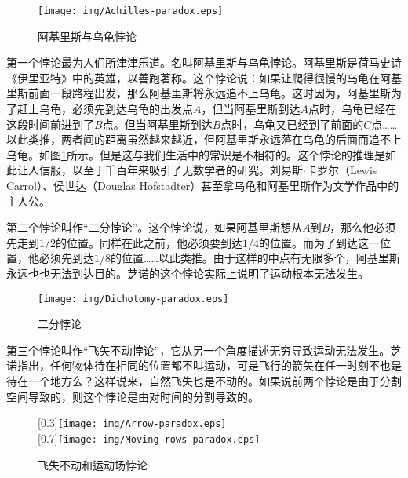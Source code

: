 \documentclass{article}
\begin{document}
\begin{figure}[htbp]
 \centering
 \texttt{[image: img/Achilles-paradox.eps]}
 \caption{阿基里斯与乌龟悖论}
 \label{fig:Achilles-paradox}
\end{figure}

第一个悖论最为人们所津津乐道。名叫阿基里斯与乌龟悖论。阿基里斯是荷马史诗《伊里亚特》中的英雄，以善跑著称。这个悖论说：如果让爬得很慢的乌龟在阿基里斯前面一段路程出发，那么阿基里斯将永远追不上乌龟。这时因为，阿基里斯为了赶上乌龟，必须先到达乌龟的出发点$A$，但当阿基里斯到达$A$点时，乌龟已经在这段时间前进到了$B$点。但当阿基里斯到达$B$点时，乌龟又已经到了前面的$C$点……以此类推，两者间的距离虽然越来越近，但阿基里斯永远落在乌龟的后面而追不上乌龟。如图\ref{fig:Achilles-paradox}所示。但是这与我们生活中的常识是不相符的。这个悖论的推理是如此让人信服，以至于千百年来吸引了无数学者的研究。刘易斯$\cdot$卡罗尔（Lewis Carrol）、侯世达（Douglas Hofstadter）甚至拿乌龟和阿基里斯作为文学作品中的主人公。

第二个悖论叫作“二分悖论”。这个悖论说，如果阿基里斯想从$A$到$B$，那么他必须先走到$1/2$的位置。同样在此之前，他必须要到达$1/4$的位置。而为了到达这一位置，他必须先到达$1/8$的位置……以此类推。由于这样的中点有无限多个，阿基里斯永远也也无法到达目的。芝诺的这个悖论实际上说明了运动根本无法发生。

\begin{figure}[htbp]
 \centering
 \texttt{[image: img/Dichotomy-paradox.eps]}
 \caption{二分悖论}
 \label{fig:Dichotomy-paradox}
\end{figure}

第三个悖论叫作“飞矢不动悖论”，它从另一个角度描述无穷导致运动无法发生。芝诺指出，任何物体待在相同的位置都不叫运动，可是飞行的箭矢在任一时刻不也是待在一个地方么？这样说来，自然飞失也是不动的。如果说前两个悖论是由于分割空间导致的，则这个悖论是由对时间的分割导致的。

\begin{figure}[htbp]
 \centering
 [0.3\linewidth]{\texttt{[image: img/Arrow-paradox.eps]}} \\
 [0.7\linewidth]{\texttt{[image: img/Moving-rows-paradox.eps]}}
 \caption{飞失不动和运动场悖论}
 \label{fig:Arrow-and-Moving-rows-paradox}
\end{figure}
\end{document}
